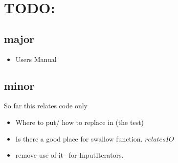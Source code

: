 \section{TODO:}
\subsection{major}

\begin{itemize}
\item Users Manual
\end{itemize}

\subsection{minor}

So far this relates code only
\begin{itemize}
\item 
Where to put/ how to replace  in  (the test)
\item 
Is there a good place for swallow function. $relates IO$
\item
remove use of it-- for InputIterators. 
\end{itemize}